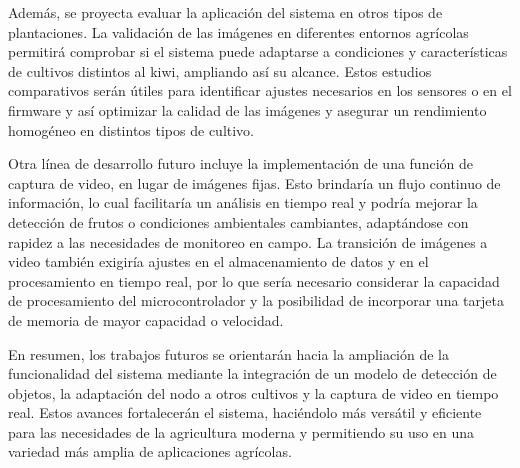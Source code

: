 Además, se proyecta evaluar la aplicación del sistema en otros tipos de plantaciones. La validación de las imágenes en diferentes entornos agrícolas permitirá comprobar si el sistema puede adaptarse a condiciones y características de cultivos distintos al kiwi, ampliando así su alcance. Estos estudios comparativos serán útiles para identificar ajustes necesarios en los sensores o en el firmware y así optimizar la calidad de las imágenes y asegurar un rendimiento homogéneo en distintos tipos de cultivo.

Otra línea de desarrollo futuro incluye la implementación de una función de captura de video, en lugar de imágenes fijas. Esto brindaría un flujo continuo de información, lo cual facilitaría un análisis en tiempo real y podría mejorar la detección de frutos o condiciones ambientales cambiantes, adaptándose con rapidez a las necesidades de monitoreo en campo. La transición de imágenes a video también exigiría ajustes en el almacenamiento de datos y en el procesamiento en tiempo real, por lo que sería necesario considerar la capacidad de procesamiento del microcontrolador y la posibilidad de incorporar una tarjeta de memoria de mayor capacidad o velocidad.

En resumen, los trabajos futuros se orientarán hacia la ampliación de la funcionalidad del sistema mediante la integración de un modelo de detección de objetos, la adaptación del nodo a otros cultivos y la captura de video en tiempo real. Estos avances fortalecerán el sistema, haciéndolo más versátil y eficiente para las necesidades de la agricultura moderna y permitiendo su uso en una variedad más amplia de aplicaciones agrícolas.


\newpage
